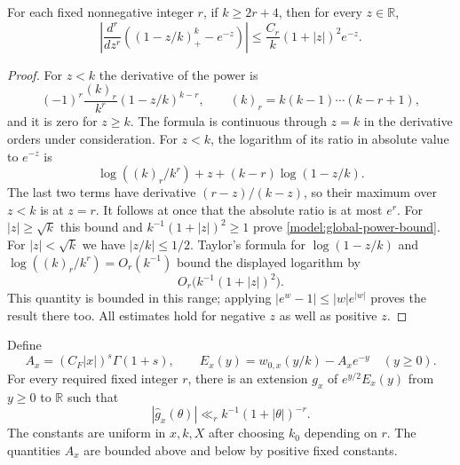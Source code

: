\begin{lemma}
\label{model:global-power-approximation}
For each fixed nonnegative integer $r$, if $k\ge2r+4$, then for every
$z\in\mathbb R$,
\begin{equation}
 \left|\frac{d^r}{dz^r}
           \left((1-z/k)_+^k-e^{-z}\right)\right|
 \le\frac{C_r}{k}(1+|z|)^2e^{-z}.
 \label{model:global-power-bound}
\end{equation}
\end{lemma}

\begin{proof}
For $z<k$ the derivative of the power is
\[
 (-1)^r\frac{(k)_r}{k^r}(1-z/k)^{k-r},\qquad
 (k)_r=k(k-1)\cdots(k-r+1),
\]
and it is zero for $z\ge k$.  The formula is continuous through $z=k$
in the derivative orders under consideration.  For $z<k$, the logarithm
of its ratio in absolute value to $e^{-z}$ is
\[
 \log((k)_r/k^r)+z+(k-r)\log(1-z/k).
\]
The last two terms have derivative $(r-z)/(k-z)$, so their maximum
over $z<k$ is at $z=r$.  It follows at once that the absolute ratio is
at most $e^r$.  For $|z|\ge\sqrt k$ this bound and
\mbox{$k^{-1}(1+|z|)^2\ge1$} prove \eqref{model:global-power-bound}.
For $|z|<\sqrt k$ we have $|z/k|\le1/2$.  Taylor's formula for
$\log(1-z/k)$ and
$\log((k)_r/k^r)=O_r(k^{-1})$ bound the displayed logarithm by
\[
 O_r\big(k^{-1}(1+|z|)^2\big).
\]
This quantity is bounded in this range; applying
$|e^w-1|\le |w|e^{|w|}$ proves the result there too.  All estimates
hold for negative $z$ as well as positive $z$.
\end{proof}

\begin{lemma}
\label{model:first-Fourier-error}
Define
\[
 A_x=(C_F|x|)^s\Gamma(1+s),\qquad
 E_x(y)=w_{0,x}(y/k)-A_xe^{-y}\quad(y\ge0).
\]
For every required fixed integer $r$, there is an extension $g_x$ of
$e^{y/2}E_x(y)$ from $y\ge0$ to $\mathbb R$ such that
\begin{equation}
 |\widehat g_x(\theta)|\ll_r k^{-1}(1+|\theta|)^{-r}.
 \label{model:first-Fourier-decay}
\end{equation}
The constants are uniform in $x,k,X$ after choosing $k_0$ depending on
$r$.  The quantities $A_x$ are bounded above and below by positive
fixed constants.
\end{lemma}

